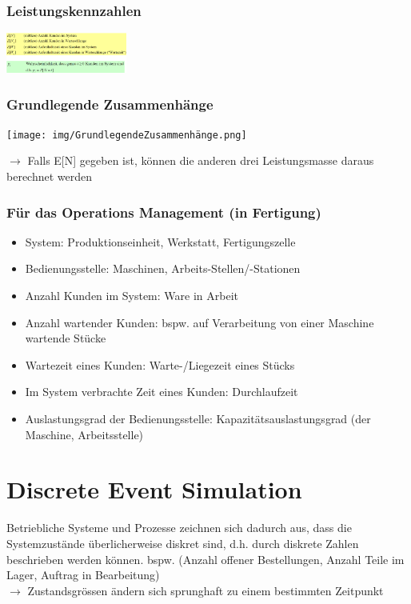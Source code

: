\documentclass{report}
\newenvironment{Figure}
	{\par\medskip\noindent\minipage{\linewidth}}
	{\endminipage\par\medskip}
\theoremstyle{definition}
\theoremstyle{example}
\begin{document}
      \subsubsection{Leistungskennzahlen}
\begin{Figure}
\centering
\includegraphics[width=150px]{img/Leistungskennzahlen.png}
	\label{fig:Abbildung der Leistungskennzahlen}
\end{Figure}

   \subsubsection{Grundlegende Zusammenhänge}
\begin{Figure}
\centering
\texttt{[image: img/GrundlegendeZusammenhänge.png]}
	\label{fig:Abbildung der grundlegende Zusammenhänge}
\end{Figure}
$\rightarrow$ Falls E[N] gegeben ist, können die anderen drei Leistungsmasse daraus berechnet werden

      \subsubsection{Für das Operations Management (in Fertigung)}

\begin{itemize}
   \item System: Produktionseinheit, Werkstatt, Fertigungszelle
   \item Bedienungsstelle: Maschinen, Arbeits-Stellen/-Stationen
   \item Anzahl Kunden im System: Ware in Arbeit
   \item Anzahl wartender Kunden: bspw. auf Verarbeitung von einer Maschine wartende Stücke
   \item Wartezeit eines Kunden: Warte-/Liegezeit eines Stücks
   \item Im System verbrachte Zeit eines Kunden: Durchlaufzeit
   \item Auslastungsgrad der Bedienungsstelle: Kapazitätsauslastungsgrad (der Maschine, Arbeitsstelle)
\end{itemize}

\section{Discrete Event Simulation}
Betriebliche Systeme und Prozesse zeichnen sich dadurch aus, dass die Systemzustände überlicherweise diskret sind, d.h. durch diskrete Zahlen beschrieben werden können. bspw. (Anzahl offener Bestellungen, Anzahl Teile im Lager, Auftrag in Bearbeitung)\\
$\rightarrow$ Zustandsgrössen ändern sich sprunghaft zu einem bestimmten Zeitpunkt
\end{document}
